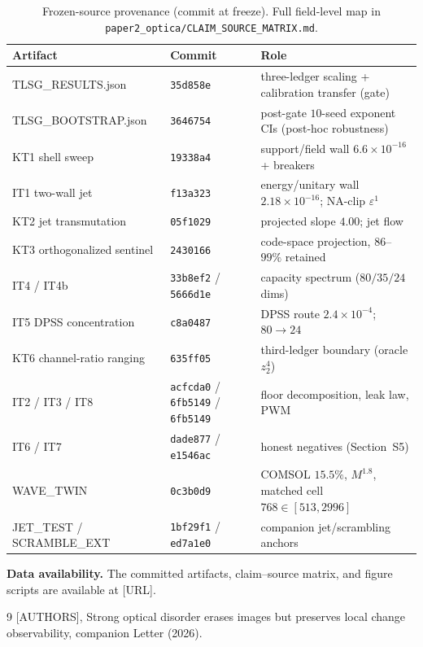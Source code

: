 \documentclass[10pt,onecolumn]{article}
\theoremstyle{plain}
\theoremstyle{definition}
\newcommand{\eps}{\varepsilon}
\begin{document}
\begin{table}[t]
\centering
\caption{Frozen-source provenance (commit at freeze). Full field-level map in
\texttt{paper2\_optica/CLAIM\_SOURCE\_MATRIX.md}.}
\label{tab:s-prov}
\small
\begin{tabular}{@{}p{}p{}p{}@{}}
\toprule
Artifact & Commit & Role \\
\midrule
TLSG\_RESULTS.json & \texttt{35d858e} & three-ledger scaling + calibration transfer (gate) \\
TLSG\_BOOTSTRAP.json & \texttt{3646754} & post-gate $10$-seed exponent CIs (post-hoc robustness) \\
KT1 shell sweep & \texttt{19338a4} & support/field wall $6.6\times10^{-16}$ + breakers \\
IT1 two-wall jet & \texttt{f13a323} & energy/unitary wall $2.18\times10^{-16}$; NA-clip $\eps^1$ \\
KT2 jet transmutation & \texttt{05f1029} & projected slope $4.00$; jet flow \\
KT3 orthogonalized sentinel & \texttt{2430166} & code-space projection, $86$--$99\%$ retained \\
IT4 / IT4b & \texttt{33b8ef2} / \texttt{5666d1e} & capacity spectrum ($80/35/24$ dims) \\
IT5 DPSS concentration & \texttt{c8a0487} & DPSS route $2.4\times10^{-4}$; $80\to24$ \\
KT6 channel-ratio ranging & \texttt{635ff05} & third-ledger boundary (oracle $z_2^4$) \\
IT2 / IT3 / IT8 & \texttt{acfcda0} / \texttt{6fb5149} / \texttt{6fb5149} & floor decomposition, leak law, PWM \\
IT6 / IT7 & \texttt{dade877} / \texttt{e1546ac} & honest negatives (Section~S5) \\
WAVE\_TWIN & \texttt{0c3b0d9} & COMSOL $15.5\%$, $M^{1.8}$, matched cell $768\in[513,2996]$ \\
JET\_TEST / SCRAMBLE\_EXT & \texttt{1bf29f1} / \texttt{ed7a1e0} & companion jet/scrambling anchors \\
\bottomrule
\end{tabular}
\end{table}

\vspace{4pt}
\noindent\textbf{Data availability.} The committed artifacts, claim--source matrix,
and figure scripts are available at [URL].

\begin{thebibliography}{9}
[AUTHORS], Strong optical disorder erases images but preserves
local change observability, companion Letter (2026).
\end{thebibliography}
\end{document}
